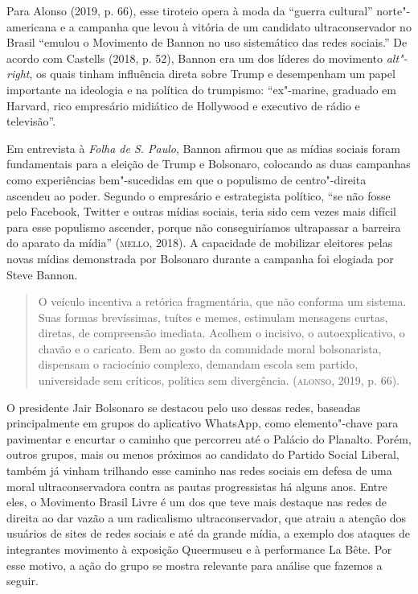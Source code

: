 Para Alonso (2019, p. 66), esse tiroteio opera à moda da ``guerra
cultural'' norte"-americana e a campanha que levou à vitória de um
candidato ultraconservador no Brasil ``emulou o Movimento de Bannon no
uso sistemático das redes sociais.'' De acordo com Castells (2018, p.
52), Bannon era um dos líderes do movimento \emph{alt"-right}, os quais
tinham influência direta sobre Trump e desempenham um papel importante
na ideologia e na política do trumpismo: ``ex"-marine, graduado em
Harvard, rico empresário midiático de Hollywood e executivo de rádio e
televisão''.

Em entrevista à \emph{Folha de S. Paulo}, Bannon afirmou que as mídias
sociais foram fundamentais para a eleição de Trump e Bolsonaro,
colocando as duas campanhas como experiências bem"-sucedidas em que o
populismo de centro"-direita ascendeu ao poder. Segundo o empresário e
estrategista político, ``se não fosse pelo Facebook, Twitter e outras
mídias sociais, teria sido cem vezes mais difícil para esse populismo
ascender, porque não conseguiríamos ultrapassar a barreira do aparato da
mídia'' (\textsc{mello}, 2018). A capacidade de mobilizar eleitores pelas novas
mídias demonstrada por Bolsonaro durante a campanha foi elogiada por
Steve Bannon.

\begin{quote}
O veículo incentiva a retórica fragmentária, que não conforma um
sistema. Suas formas brevíssimas, tuítes e memes, estimulam mensagens
curtas, diretas, de compreensão imediata. Acolhem o incisivo, o
autoexplicativo, o chavão e o caricato. Bem ao gosto da comunidade moral
bolsonarista, dispensam o raciocínio complexo, demandam escola sem
partido, universidade sem críticos, política sem divergência. (\textsc{alonso},
2019, p. 66).
\end{quote}

O presidente Jair Bolsonaro se destacou pelo uso dessas redes, baseadas
principalmente em grupos do aplicativo WhatsApp, como elemento"-chave
para pavimentar e encurtar o caminho que percorreu até o Palácio do
Planalto. Porém, outros grupos, mais ou menos próximos ao candidato do
Partido Social Liberal, também já vinham trilhando esse caminho nas
redes sociais em defesa de uma moral ultraconservadora contra as pautas
progressistas há alguns anos. Entre eles, o Movimento Brasil Livre é um
dos que teve mais destaque nas redes de direita ao dar vazão a um
radicalismo ultraconservador, que atraiu a atenção dos usuários de sites
de redes sociais e até da grande mídia, a exemplo dos ataques de
integrantes movimento à exposição Queermuseu e à performance La Bête.
Por esse motivo, a ação do grupo se mostra relevante para análise que
fazemos a seguir.

